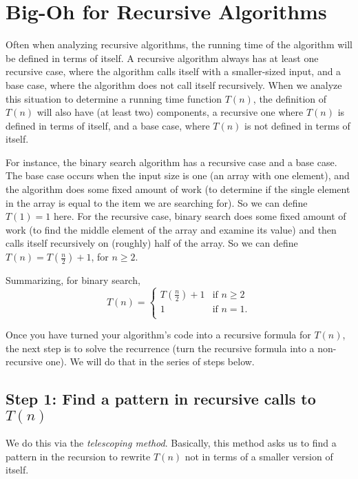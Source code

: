 \documentclass [letterpaper,12pt]{article}
\begin{document}
\section*{Big-Oh for Recursive Algorithms}

Often when analyzing recursive algorithms, the running time of the algorithm will be defined 
in terms of itself.  A recursive algorithm always has at least one recursive case, where the algorithm
calls itself with a smaller-sized input, and a base case, where the algorithm does not call itself 
recursively.  When we analyze this situation to determine a running time function $T(n)$, 
the definition of $T(n)$ will also have (at least two) components, a recursive one where $T(n)$ is defined 
in terms of itself, and a base case, where $T(n)$ is not defined in terms of itself.

For instance, the binary search algorithm has a recursive case and a base case.  The base case occurs when the input
size is one (an array with one element), and the algorithm does some fixed amount of work (to determine
if the single element in the array is equal to the item we are searching for).  So we can define $T(1)=1$ here.
For the recursive case, binary search does some fixed amount of work (to find the middle element of the array and 
examine its value) and then calls itself recursively on (roughly) half of the array.  So we can define
$T(n)=T(\frac{n}{2}) + 1$, for $n \geq 2$.

Summarizing, for binary search, 
\[ 
T(n) = \begin{cases}

T(\frac{n}{2}) + 1 & \text{if } n \geq 2 \\
1 &\text{if } n=1.\\
\end{cases} 
\]

Once you have turned your algorithm's code into a recursive formula for $T(n)$, the next step is
to solve the recurrence (turn the recursive formula into a non-recursive one).  We will do that in the series of
steps below.

\subsection*{Step 1: Find a pattern in recursive calls to $T(n)$}

We do this via the \emph{telescoping method}.  Basically, this method asks us to find a pattern in the recursion to 
rewrite $T(n)$ not in terms of a smaller version of itself.
\end{document}
